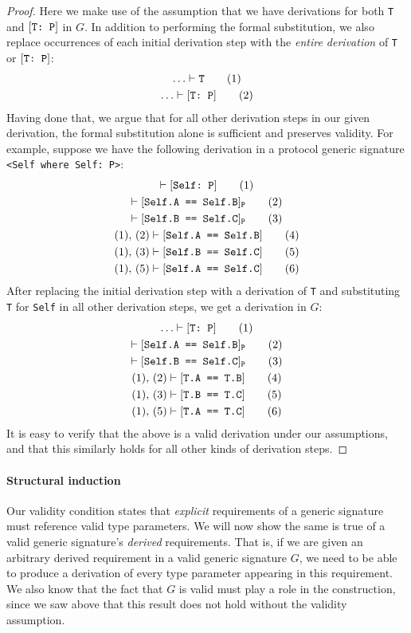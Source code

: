 \documentclass[../generics]{subfiles}
\begin{document}
\begin{proof}
Here we make use of the assumption that we have derivations for both \texttt{T} and $[\texttt{T:~P}]$ in $G$. In addition to performing the formal substitution, we also replace occurrences of each initial derivation step with the \emph{entire derivation} of \texttt{T} or $[\texttt{T:~P}]$:
\begin{gather}
\ldots \vdash \texttt{T}\tag{1}\\
\ldots \vdash [\texttt{T:~P}]\tag{2}
\end{gather}
Having done that, we argue that for all other derivation steps in our given derivation, the formal substitution alone is sufficient and preserves validity. For example, suppose we have the following derivation in a protocol generic signature \verb|<Self where Self: P>|:
\begin{gather}
\vdash[\texttt{Self:~P}]\tag{1}\\
\vdash[\texttt{Self.A == Self.B}]_\texttt{P}\tag{2}\\
\vdash[\texttt{Self.B == Self.C}]_\texttt{P}\tag{3}\\
(1),\,(2)\vdash[\texttt{Self.A == Self.B}]\tag{4}\\
(1),\,(3)\vdash[\texttt{Self.B == Self.C}]\tag{5}\\
(1),\,(5)\vdash[\texttt{Self.A == Self.C}]\tag{6}
\end{gather}
After replacing the initial derivation step with a derivation of \texttt{T} and substituting \texttt{T} for \texttt{Self} in all other derivation steps, we get a derivation in $G$:
\begin{gather}
\ldots \vdash[\texttt{T:~P}]\tag{1}\\
\vdash[\texttt{Self.A == Self.B}]_\texttt{P}\tag{2}\\
\vdash[\texttt{Self.B == Self.C}]_\texttt{P}\tag{3}\\
(1),\,(2)\vdash[\texttt{T.A == T.B}]\tag{4}\\
(1),\,(3)\vdash[\texttt{T.B == T.C}]\tag{5}\\
(1),\,(5)\vdash[\texttt{T.A == T.C}]\tag{6}
\end{gather}
It is easy to verify that the above is a valid derivation under our assumptions, and that this similarly holds for all other kinds of derivation steps.
\end{proof}

\paragraph{Structural induction}
Our validity condition states that \emph{explicit} requirements of a generic signature must reference valid type parameters. We will now show the same is true of a valid generic signature's \emph{derived} requirements. That is, if we are given an arbitrary derived requirement in a valid generic signature $G$, we need to be able to produce a derivation of every type parameter appearing in this requirement. We also know that the fact that $G$ is valid must play a role in the construction, since we saw above that this result does not hold without the validity assumption.
\end{document}
